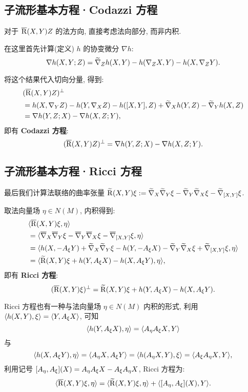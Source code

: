 \subsection{子流形基本方程·Codazzi 方程}
对于 $\overline{\mathrm{R}}(X, Y)Z$ 的法方向, 直接考虑法向部分, 而非内积.

在这里首先计算(定义) $h$ 的协变微分 $\nabla h$:
$$
	\nabla h(X, Y; Z) = \widetilde{\nabla}_{Z}{h(X, Y)} - h(\nabla_{Z}{X}, Y) - h(X, \nabla_{Z}{Y}).
$$

将这个结果代入切向分量, 得到:
\begin{align*}
	&(\overline{\mathrm{R}}(X, Y)Z)^{\perp} \\
	&= h(X, \nabla_{Y}{Z}) - h(Y, \nabla_{X}{Z}) - h([X, Y], Z) + \widetilde{\nabla}_{X}{h(Y, Z)} - \widetilde{\nabla}_{Y}{h(X, Z)} \\
	&= \nabla h(Y, Z; X) - \nabla h(X, Z; Y),
\end{align*}
即有 {\bf Codazzi 方程}:
\begin{equation}\label{eq::Codazzi-equation}
	(\overline{\mathrm{R}}(X, Y)Z)^{\perp} = \nabla h(Y, Z; X) - \nabla h(X, Z; Y).
\end{equation}

\subsection{子流形基本方程·Ricci 方程}
最后我们计算法联络的曲率张量 $\widetilde{\mathrm{R}}(X, Y)\xi := \widetilde{\nabla}_{X}{\widetilde{\nabla}_{Y}{\xi}} - \widetilde{\nabla}_{Y}{\widetilde{\nabla}_{X}{\xi}} - \widetilde{\nabla}_{[X, Y]}{\xi}$.

取法向量场 $\eta \in N(M)$, 内积得到:
\begin{align*}
	&\langle {\overline{\mathrm{R}}(X, Y)\xi}, {\eta} \rangle \\
	&= \langle {\overline{\nabla}_{X}{\overline{\nabla}_{Y}{\xi}} - \overline{\nabla}_{Y}{\overline{\nabla}_{X}{\xi}} - \overline{\nabla}_{[X, Y]}{\xi}}, {\eta} \rangle \\
	&= \langle {h(X, -A_{\xi}{Y}) + \widetilde{\nabla}_{X}{\widetilde{\nabla}_{Y}{\xi}} - h(Y, -A_{\xi}{X}) - \widetilde{\nabla}_{Y}{\widetilde{\nabla}_{X}{\xi}} + \widetilde{\nabla}_{[X, Y]}{\xi}}, {\eta} \rangle \\
	&= \langle {\widetilde{\mathrm{R}}(X, Y)\xi + h(Y, A_{\xi}{X}) - h(X, A_{\xi}{Y})}, {\eta} \rangle,
\end{align*}
即有 {\bf Ricci 方程}:
\begin{equation}\label{eq::Ricci-equation}
	(\overline{\mathrm{R}}(X, Y)\xi)^{\perp} = \widetilde{\mathrm{R}}(X, Y)\xi + h(Y, A_{\xi}{X}) - h(X, A_{\xi}{Y}).
\end{equation}

Ricci 方程也有一种与法向量场 $\eta \in N(M)$ 内积的形式, 利用 $\langle {h(X, Y)}, {\xi} \rangle = \langle {Y}, {A_{\xi}X} \rangle$, 可知
\[
	\langle {h(Y, A_{\xi}{X})}, {\eta} \rangle = \langle {A_{\eta}A_{\xi}{X}}, {Y} \rangle
\]
与 
\[
	\langle {h(X, A_{\xi}{Y})}, {\eta} \rangle = \langle {A_{\eta}{X}}, {A_{\xi}Y} \rangle = \langle {h(A_{\eta}X, Y)}, {\xi} \rangle = \langle {A_{\xi}A_{\eta}X}, {Y} \rangle,
\]
利用记号 $[A_{\eta}, A_{\xi}](X) = A_{\eta}A_{\xi}{X} - A_{\xi}A_{\eta}X$, Ricci 方程为:
\[
	\langle {\overline{\mathrm{R}}(X, Y)\xi}, {\eta} \rangle = \langle {\widetilde{\mathrm{R}}(X, Y)\xi}, {\eta} \rangle + \langle {[A_{\eta}, A_{\xi}](X)}, {Y} \rangle.
\]

